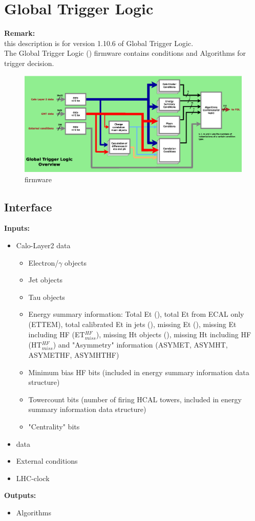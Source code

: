 \section{Global Trigger Logic}
\label{sec:gtl:global_trigger_logic}
\textbf{Remark:}\\
this description is for version 1.10.6 of Global Trigger Logic.\\

The Global Trigger Logic (\ugtl) firmware contains conditions and Algorithms for trigger decision.

\begin{figure}[htb]
\centering
\includegraphics[width=15cm]{figures/mGTL_firmware}
\caption{\ugtl firmware} 
\label{fig:gtl:mGTL_firmware}
\end{figure}

\subsection{\ugtl Interface}
\label{sec:gtl:ugtl_interface}

\textbf{Inputs:}
\begin{itemize}
\item Calo-Layer2 data
\begin{itemize}
\item Electron/$\gamma$ objects
\item Jet objects
\item Tau objects
\item Energy summary information: Total Et (\ett), total Et from ECAL only (ETTEM), total calibrated Et in jets (\htt), missing Et (\etm), missing Et including HF (ET$_{miss}^{HF}$), missing Ht objects (\htm),
missing Ht including HF (HT$_{miss}^{HF}$) and "Asymmetry" information (ASYMET, ASYMHT, ASYMETHF, ASYMHTHF) 
\item Minimum bias HF bits (included in energy summary information data structure)
\item Towercount bits (number of firing HCAL towers, included in energy summary information data structure)
\item "Centrality" bits
\end{itemize}
\item \gmt data
\item External conditions
\item LHC-clock 
\end{itemize}
\textbf{Outputs:}
\begin{itemize}
\item Algorithms
\end{itemize}

